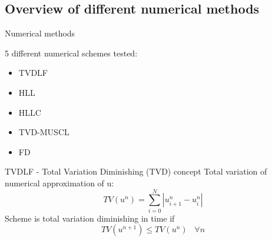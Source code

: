 \subsection{Overview of different numerical methods}
\begin{frame}{Numerical methods}

5 different numerical schemes tested:
\begin{itemize}
  	\item TVDLF
  	\item  HLL
  	\item HLLC
  	\item TVD-MUSCL 
  	\item FD
\end{itemize}

\end{frame}



\begin{frame}{TVDLF - Total Variation Diminishing (TVD) concept}
	Total variation of numerical approximation of u:
	\begin{equation*}
		TV(u^n) = \sum_{i=0}^{N} |u_{i+1}^n-u_i^n|
	\end{equation*}
	Scheme is total variation diminishing in time if
	\begin{equation*}
		TV(u^{n+1}) \leq TV(u^{n}) \; \; \; \forall n
	\end{equation*}
\end{frame}


